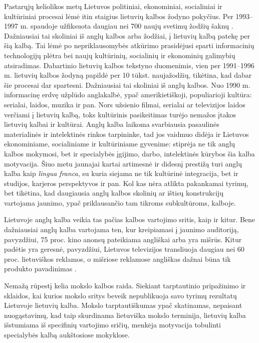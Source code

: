 \begin{multicols}{2}
    Pastarųjų keliolikos metų Lietuvos politiniai, ekonominiai, socialiniai ir kultūriniai procesai lėmė itin staigius lietuvių kalbos žodyno pokyčius. Per 1993–1997 m. spaudoje užfiksuota daugiau nei 700 naujų svetimų žodžių šaknų \cite{nbi1}. Dažniausiai tai skoliniai iš anglų kalbos arba žodžiai, į lietuvių kalbą patekę per šią kalbą. Tai lėmė po nepriklausomybės atkūrimo prasidėjusi sparti informacinių technologijų plėtra bei naujų kultūrinių, socialinių ir ekonominių galimybių atsiradimas. Dabartinio lietuvių kalbos tekstyno duomenimis, vien per 1991–1996 m. lietuvių kalbos žodyną papildė per 10 tūkst. naujažodžių, tikėtina, kad dabar šie procesai dar spartesni. Dažniausiai tai skoliniai iš anglų kalbos. Nuo 1990 m. informacinę erdvę užplūdo anglakalbė, ypač amerikietiškoji, populiarioji kultūra: serialai, laidos, muzika ir pan. Nors užsienio filmai, serialai ar televizijos laidos verčiami į lietuvių kalbą, toks kultūrinis pasikeitimas turėjo nemažos įtakos lietuvių kalbai ir kultūrai. Anglų kalba laikoma svarbiausia pasaulinės materialinės ir intelektinės rinkos tarpininke, tad jos vaidmuo didėja ir Lietuvos ekonominiame, socialiniame ir kultūriniame gyvenime: stiprėja ne tik anglų kalbos mokymosi, bet ir specialybės įgijimo, darbo, intelektinės kūrybos šia kalba motyvacija. Šiuo metu jaunajai kartai artimesnė ir didesnį prestižą turi anglų kalba kaip \textit{lingua franca}, su kuria siejama ne tik kultūrinė integracija, bet ir studijos, karjeros perspektyvos ir pan. Kol kas nėra atlikta pakankamai tyrimų, bet tikėtina, kad daugiausia anglų kalbos skolinių ar ištisų konstrukcijų vartojama jaunimo, ypač priklausančio tam tikroms subkultūroms, kalboje.   

    Lietuvoje anglų kalba veikia tas pačias kalbos vartojimo sritis, kaip ir kitur. Bene dažniausiai anglų kalba vartojama ten, kur kreipiamasi į jaunimo auditoriją, pavyzdžiui, 75 proc. kino anonsų pateikiama angliškai arba yra mišrūs. Kitur padėtis yra geresnė, pavyzdžiui, Lietuvos televizijos transliuoja daugiau nei 60 proc. lietuviškos reklamos, o mišriose reklamose angliškas dažnai būna tik produkto pavadinimas \cite{nbi2}.

Nemažą rūpestį kelia mokslo kalbos raida. Siekiant tarptautinio pripažinimo ir sklaidos, kai kurios mokslo sritys beveik nepublikuoja savo tyrimų rezultatų Lietuvoje lietuvių kalba. Mokslo tarptautiškumas ypač skatinamas, nepaisant nuogąstavimų, kad taip skurdinama lietuviška mokslo terminija, lietuvių kalba išstumiama iš specifinių vartojimo sričių, menkėja motyvacija tobulinti specialybės kalbą aukštosiose mokyklose.


\end{multicols}
